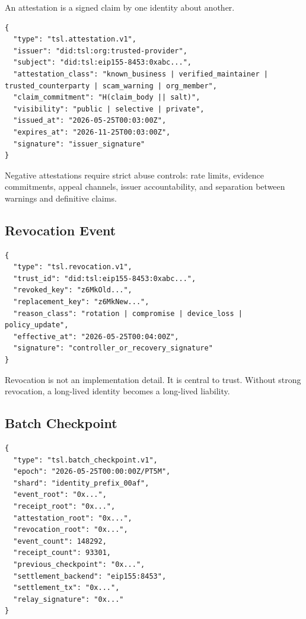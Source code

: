 \documentclass[11pt]{article}
\begin{document}
An attestation is a signed claim by one identity about another.

\begin{lstlisting}[style=tslcode]
{
  "type": "tsl.attestation.v1",
  "issuer": "did:tsl:org:trusted-provider",
  "subject": "did:tsl:eip155-8453:0xabc...",
  "attestation_class": "known_business | verified_maintainer | trusted_counterparty | scam_warning | org_member",
  "claim_commitment": "H(claim_body || salt)",
  "visibility": "public | selective | private",
  "issued_at": "2026-05-25T00:03:00Z",
  "expires_at": "2026-11-25T00:03:00Z",
  "signature": "issuer_signature"
}
\end{lstlisting}

Negative attestations require strict abuse controls: rate limits, evidence commitments, appeal channels, issuer accountability, and separation between warnings and definitive claims.

\subsection{Revocation Event}

\begin{lstlisting}[style=tslcode]
{
  "type": "tsl.revocation.v1",
  "trust_id": "did:tsl:eip155-8453:0xabc...",
  "revoked_key": "z6MkOld...",
  "replacement_key": "z6MkNew...",
  "reason_class": "rotation | compromise | device_loss | policy_update",
  "effective_at": "2026-05-25T00:04:00Z",
  "signature": "controller_or_recovery_signature"
}
\end{lstlisting}

Revocation is not an implementation detail. It is central to trust. Without strong revocation, a long-lived identity becomes a long-lived liability.

\subsection{Batch Checkpoint}

\begin{lstlisting}[style=tslcode]
{
  "type": "tsl.batch_checkpoint.v1",
  "epoch": "2026-05-25T00:00:00Z/PT5M",
  "shard": "identity_prefix_00af",
  "event_root": "0x...",
  "receipt_root": "0x...",
  "attestation_root": "0x...",
  "revocation_root": "0x...",
  "event_count": 148292,
  "receipt_count": 93301,
  "previous_checkpoint": "0x...",
  "settlement_backend": "eip155:8453",
  "settlement_tx": "0x...",
  "relay_signature": "0x..."
}
\end{lstlisting}
\end{document}
